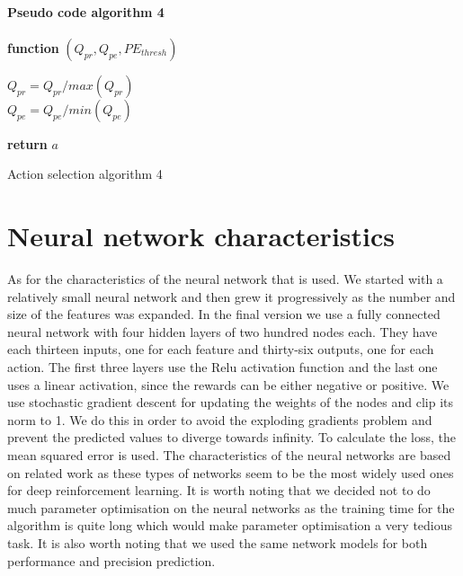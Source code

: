 \paragraph{Pseudo code algorithm 4}
\begin{center}
	\begin{algorithm}[H]

    \textbf{function}  $(Q_{pr},Q_{pe},PE_{thresh})$\;
    
    
    \Indp{}\Indm
    \Indp{} \Indm
    \Indp
    $Q_{pr} = Q_{pr}/max(Q_{pr})$\\
    $Q_{pe} = Q_{pe}/min(Q_{pe})$\\
   
  
   \textbf{return} $a$
   
    
\caption{Action selection algorithm 4}
\end{algorithm}
\end{center}
\section{Neural network characteristics}
As for the characteristics of the neural network that is used. We started with a relatively small neural network and then grew it progressively as the number and size of the features was expanded. In the final version we use a fully connected neural network with four hidden layers of two hundred nodes each. They have each thirteen inputs, one for each feature and thirty-six outputs, one for each action. The first three layers use the Relu activation function and the last one uses a linear activation, since the rewards can be either negative or positive. We use stochastic gradient descent for updating the weights of the nodes and clip its norm to 1. We do this in order to avoid the exploding gradients problem and prevent the predicted values to diverge towards infinity. To calculate the loss, the mean squared error is used. The characteristics of the neural networks are based on related work as these types of networks seem to be the most widely used ones for deep reinforcement learning. It is worth noting that we decided not to do much parameter optimisation on the neural networks as the training time for the algorithm is quite long which would make parameter optimisation a very tedious task. It is also worth noting that we used the same network models for both performance and precision prediction.
